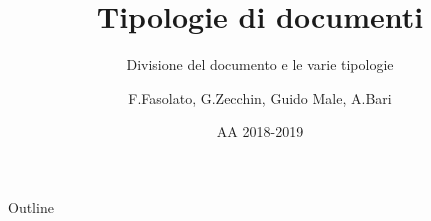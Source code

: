 \documentclass[dvipsnames]{beamer}
\title{Tipologie di documenti}
\subtitle{Divisione del documento e le varie tipologie}
\author{F.Fasolato, G.Zecchin, Guido Male, A.Bari}
\date{AA 2018-2019}
\begin{document}
    \maketitle
    \begin{frame}{Outline}
        \tableofcontents
    \end{frame}
    
\end{document}
